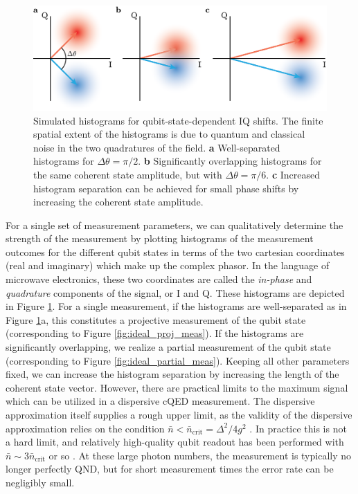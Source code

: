 \begin{figure}
\begin{center}
	\includegraphics[width = 6in]{scqb_chapter/IQ_blobs.png}
\end{center}
\caption[IQ histograms for various parameters]{Simulated histograms for qubit-state-dependent IQ shifts.  The finite spatial extent of the histograms is due to quantum and classical noise in the two quadratures of the field.  \textbf{a} Well-separated histograms for $\Delta \theta = \pi/2$.  \textbf{b} Significantly overlapping histograms for the same coherent state amplitude, but with $\Delta \theta = \pi/6$.  \textbf{c} Increased histogram separation can be achieved for small phase shifts by increasing the coherent state amplitude.}
\label{fig:IQ_blobs}
\end{figure}

For a single set of measurement parameters, we can qualitatively determine the strength of the measurement by plotting histograms of the measurement outcomes for the different qubit states in terms of the two cartesian coordinates (real and imaginary) which make up the complex phasor.  In the language of microwave electronics, these two coordinates are called the \textit{in-phase} and \textit{quadrature} components of the signal, or I and Q.  These histograms are depicted in Figure \ref{fig:IQ_blobs}.  For a single measurement, if the histograms are well-separated as in Figure \ref{fig:IQ_blobs}a, this constitutes a projective measurement of the qubit state (corresponding to Figure \ref{fig:ideal_proj_meas}).  If the histograms are significantly overlapping, we realize a partial measurement of the qubit state (corresponding to Figure \ref{fig:ideal_partial_meas}).  Keeping all other parameters fixed, we can increase the histogram separation by increasing the length of the coherent state vector.  However, there are practical limits to the maximum signal which can be utilized in a dispersive cQED measurement.  The dispersive approximation itself supplies a rough upper limit, as the validity of the dispersive approximation relies on the condition $\bar{n} < \bar{n}_{\textrm{crit}} = \Delta^2/4g^2$ \cite{slichterthesis}.  In practice this is not a hard limit, and relatively high-quality qubit readout has been performed with $\bar{n} \sim 3 \bar{n}_{\textrm{crit}}$ or so \cite{Jeffrey2014}.  At these large photon numbers, the measurement is typically no longer perfectly QND, but for short measurement times the error rate can be negligibly small.

